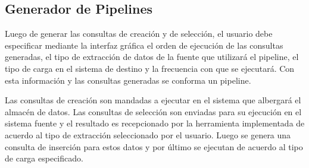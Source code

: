 \subsection{Generador de Pipelines}

Luego de generar las consultas de creación y de selección, el usuario debe especificar 
mediante la interfaz gráfica el orden de ejecución de las consultas generadas, 
el tipo de extracción de datos de la fuente que utilizar\'a el pipeline, el tipo de carga 
en el sistema de destino y la frecuencia con que se ejecutar\'a. Con esta información y las 
consultas generadas se conforma un pipeline. 

Las consultas de creación son mandadas a ejecutar en el sistema que albergar\'a el almacén de 
datos. Las consultas de selección son enviadas para su ejecución en el sistema fuente y el resultado 
es recepcionado por la herramienta implementada de acuerdo al tipo de extracción seleccionado por el usuario. 
Luego se genera una consulta de inserción para estos 
datos y por \'ultimo se ejecutan de acuerdo al tipo de carga especificado.
